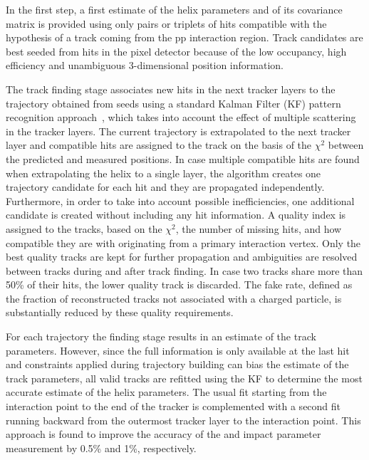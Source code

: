 In the first step, a first estimate of the helix parameters and of its covariance matrix is provided using only pairs or triplets of hits compatible with the hypothesis of a track coming from the pp interaction region. Track candidates are best seeded from hits in the pixel detector because of the low occupancy, high efficiency and unambiguous 3-dimensional position information.

The track finding stage associates new hits in the next tracker layers to the trajectory obtained from seeds using a standard Kalman Filter (KF) pattern recognition approach~\cite{Billoir:1989mh,Fruhwirth:1987fm}, which takes into account the effect of multiple scattering in the tracker layers. The current trajectory is extrapolated to the next tracker layer and compatible hits are assigned to the track on the basis of the $\chi^2$ between the predicted and measured positions. In case multiple compatible hits are found when extrapolating the helix to a single layer, the algorithm creates one trajectory candidate for each hit and they are propagated independently. Furthermore, in order to take into account possible inefficiencies, one additional candidate is created without including any hit information. A quality index is assigned to the tracks, based on the $\chi^2$, the number of missing hits, and how compatible they are with originating from a primary interaction vertex. Only the best quality tracks are kept for further propagation and ambiguities are resolved between tracks during and after track finding. In case two tracks share more than 50\% of their hits, the lower quality track is discarded.  The fake rate, defined as the fraction of reconstructed tracks not associated with a charged particle, is substantially reduced by these quality requirements.

For each trajectory the finding stage results in an estimate of the track parameters. However, since the full information is only available at the last hit and constraints applied during trajectory building can bias the estimate of the track parameters, all valid tracks are refitted using the KF to determine the most accurate estimate of the helix parameters. The usual fit starting from the interaction point to the end of the tracker is complemented with a second fit running backward from the outermost tracker layer to the interaction point. This approach is found to improve the accuracy of the \pt and impact parameter measurement by 0.5\% and 1\%, respectively.\\

